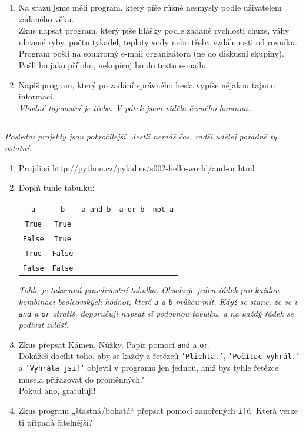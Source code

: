 \documentclass[a4paper,10pt]{article}
\newcommand\True{\texttt{True}}
\newcommand\False{\texttt{False}}
\newcommand\startsection[1]{
     \vspace{0.2ex}
    \hrule
    {\fontspec{Oxygen} \tiny
     \vspace{-1ex}
     \emph{#1}
     \vspace{-1.5em}
    }
}
\begin{document}
\begin{enumerate}[resume]

\item Na srazu jsme měli program, který píše různé nesmysly podle uživatelem zadaného věku.
    \\Zkus napsat program, který píše hlášky podle zadané
    rychlosti chůze, váhy ulovené ryby, počtu tykadel, teploty vody
    nebo třeba vzdálenosti od rovníku.
    \\Program pošli na soukromý e-mail organizátora (ne do diskusní skupiny).
    Pošli ho jako přílohu, nekopíruj ho do textu e-mailu.

\item Napiš program, který po zadání správného hesla vypíše nějakou tajnou informaci.
    \\\emph{\small Vhodné tajemství je třeba: V pátek jsem viděla černého havrana.}

\end{enumerate}

\startsection{Poslední projekty jsou pokročilejší.
Jestli nemáš čas, radši udělej pořádně ty ostatní.}

\begin{enumerate}[resume]

\item Projdi si \url{http://python.cz/pyladies/s002-hello-world/and-or.html}

\item Doplň tuhle tabulku:

    {
        \newcommand\rowend{\rule{0pt}{0.5cm}\\ \hline}
        \begin{tabular}{c|c||c|c|c}
        \arrayrulecolor{silver}
        \verb+a+ & \verb+b+ & \verb+a and b+ & \verb+a or b+ & \verb+not a+ \\
        \arrayrulecolor{black}\hline\arrayrulecolor{silver}
        \True & \True &  &  &  \rowend
        \False & \True &  &  &  \rowend
        \True & \False &  &  &  \rowend
        \False & \False &  &  &  \rowend
        \end{tabular}
    }

    \emph{\small Tohle je takzvaná \emph{pravdivostní tabulka}.
          Obsahuje jeden řádek pro každou kombinaci booleovských hodnot, které \texttt{a} a \texttt{b}
          můžou mít. Když se stane, že se v \texttt{and} a \texttt{or} ztratíš,
          doporučuji napsat si podobnou tabulku, a na každý řádek se podívat zvlášť.}

\item Zkus přepsat Kámen, Nůžky, Papír pomocí \texttt{and} a \texttt{or}.
    \\Dokážeš docílit toho, aby se každý z řetězců \texttt{'Plichta.'},
    \texttt{'Počítač vyhrál.'} a \texttt{'Vyhrála jsi!'} objevil v programu jen jednou,
    aniž bys tyhle řetězce musela přiřazovat do proměnných?
    \\Pokud ano, gratuluji!

\item Zkus program „šťastná/bohatá“ přepsat pomocí zanořených \texttt{if}ů. Která verze ti připadá čitelnější?

\end{enumerate}
\end{document}
